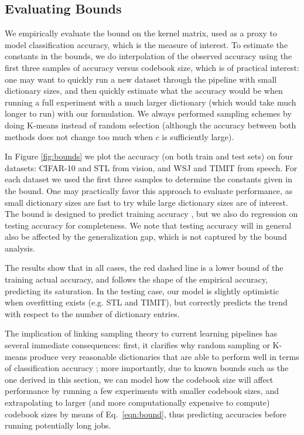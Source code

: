 \subsection{Evaluating Bounds}
We empirically evaluate the bound on the kernel matrix, used as a proxy to model classification accuracy, which is the measure of interest. To estimate the constants in the bounds, we do interpolation of the observed accuracy using the first three samples of accuracy versus codebook size, which is of practical interest: one may want to quickly run a new dataset through the pipeline with small dictionary sizes, and then quickly estimate what the accuracy would be when running a full experiment with a much larger dictionary (which would take much longer to run) with our formulation. We always performed \nystrom sampling schemes by doing K-means instead of random selection (although the accuracy between both methods does not change too much when $c$ is sufficiently large).

In Figure \ref{fig:bounds} we plot the accuracy (on both train and test sets) on four datasets: CIFAR-10 and STL from vision, and WSJ and TIMIT from speech. For each dataset we used the first three samples to determine the constants given in the bound. One may practically favor this approach to evaluate performance, as small dictionary sizes are fast to try while large dictionary sizes are of interest. The bound is designed to predict training accuracy \cite{cortes10}, but we also do regression on testing accuracy for completeness. We note that testing accuracy will in general also be affected by the generalization gap, which is not captured by the bound analysis.

The results show that in all cases, the red dashed line is a lower bound of the training actual accuracy, and follows the shape of the empirical accuracy, predicting its saturation. In the testing case, our model is slightly optimistic when overfitting exists (e.g. STL and TIMIT), but correctly predicts the trend with respect to the number of dictionary entries.

The implication of linking \nystrom sampling theory to current learning pipelines has several immediate consequences: first, it clarifies why random sampling or K-means produce very reasonable dictionaries that are able to perform well in terms of classification accuracy \cite{zhang2008improved,coates2010aistats,kumar2012sampling}; more importantly, due to known bounds such as the one derived in this section, we can model how the codebook size will affect performance by running a few experiments with smaller codebook sizes, and extrapolating to larger (and more computationally expensive to compute) codebook sizes by means of Eq.~\ref{eqn:bound}, thus predicting accuracies before running potentially long jobs.


